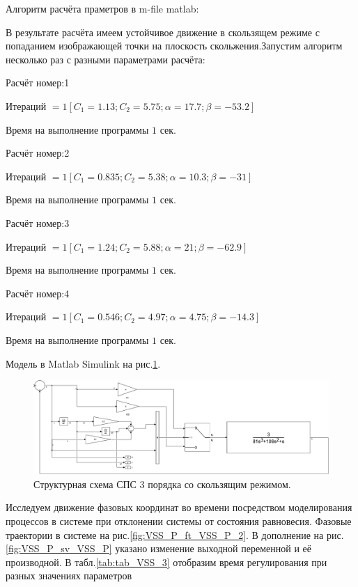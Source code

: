 Алгоритм расчёта праметров в m-file matlab:



В результате расчёта имеем устойчивое движение в скользящем режиме с попаданием изображающей точки на плоскость скольжения.Запустим алгоритм несколько раз с разными параметрами расчёта:

Расчёт номер:1


  Итераций $= 1 [ C_1=1.13 ; C_2=5.75 ; \alpha=17.7 ; \beta=-53.2 ]$

  Время на выполнение программы $1$ сек.

Расчёт номер:2


  Итераций $= 1 [ C_1=0.835 ; C_2=5.38 ; \alpha=10.3 ; \beta=-31 ]$

  Время на выполнение программы $1$ сек.

Расчёт номер:3


  Итераций $= 1 [ C_1=1.24 ; C_2=5.88 ; \alpha=21 ; \beta=-62.9 ]$

  Время на выполнение программы $1$ сек.

Расчёт номер:4


  Итераций $= 1 [ C_1=0.546 ; C_2=4.97 ; \alpha=4.75 ; \beta=-14.3 ]$

  Время на выполнение программы $1$ сек.

Модель в Matlab Simulink на рис.\ref{fig:sim_VSS_P}. 
\begin{figure}[!h]\centering
\includegraphics[width=1.0\linewidth]{images/sim_VSS_P}
\caption{Структурная схема СПС 3 порядка со скользящим режимом.}\label{fig:sim_VSS_P}
\end{figure}
Исследуем движение фазовых координат во времени посредством моделирования процессов в системе при отклонении системы от состояния равновесия. Фазовые траектории в системе на рис.\ref{fig:VSS_P_ft_VSS_P_2}. 
В дополнение на рис.\ref{fig:VSS_P_sv_VSS_P} указано изменение выходной переменной и её производной.
В табл.\ref{tab:tab_VSS_3} отобразим время регулирования при разных значениях параметров

